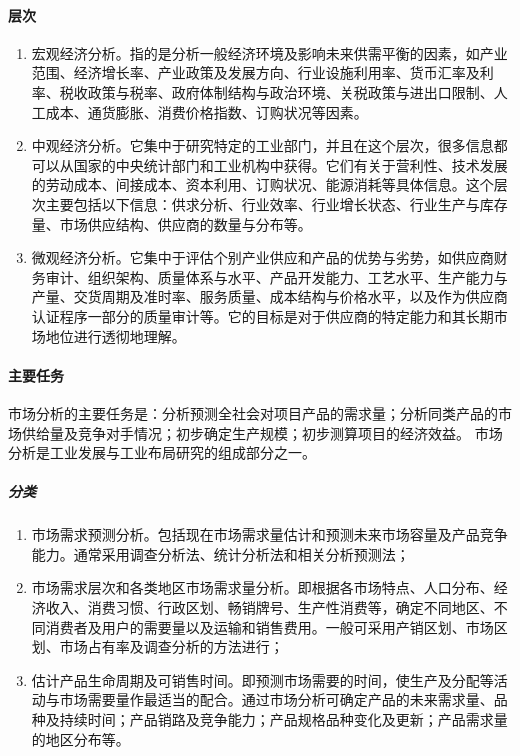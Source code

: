 \documentclass[letterpaper,11pt,english]{sphinxmanual}
\begin{document}
\paragraph{层次}
\label{\detokenize{chapter_knowledge/market_analysis:id2}}\begin{enumerate}
%
\item {} 
宏观经济分析。指的是分析一般经济环境及影响未来供需平衡的因素，如产业范围、经济增长率、产业政策及发展方向、行业设施利用率、货币汇率及利率、税收政策与税率、政府体制结构与政治环境、关税政策与进出口限制、人工成本、通货膨胀、消费价格指数、订购状况等因素。

\item {} 
中观经济分析。它集中于研究特定的工业部门，并且在这个层次，很多信息都可以从国家的中央统计部门和工业机构中获得。它们有关于营利性、技术发展的劳动成本、间接成本、资本利用、订购状况、能源消耗等具体信息。这个层次主要包括以下信息：供求分析、行业效率、行业增长状态、行业生产与库存量、市场供应结构、供应商的数量与分布等。

\item {} 
微观经济分析。它集中于评估个别产业供应和产品的优势与劣势，如供应商财务审计、组织架构、质量体系与水平、产品开发能力、工艺水平、生产能力与产量、交货周期及准时率、服务质量、成本结构与价格水平，以及作为供应商认证程序一部分的质量审计等。它的目标是对于供应商的特定能力和其长期市场地位进行透彻地理解。

\end{enumerate}


\paragraph{主要任务}
\label{\detokenize{chapter_knowledge/market_analysis:id3}}
市场分析的主要任务是：分析预测全社会对项目产品的需求量；分析同类产品的市场供给量及竞争对手情况；初步确定生产规模；初步测算项目的经济效益。
市场分析是工业发展与工业布局研究的组成部分之一。


\subparagraph{分类}
\label{\detokenize{chapter_knowledge/market_analysis:id4}}\begin{enumerate}
%
\item {} 
市场需求预测分析。包括现在市场需求量估计和预测未来市场容量及产品竞争能力。通常采用调查分析法、统计分析法和相关分析预测法；

\item {} 
市场需求层次和各类地区市场需求量分析。即根据各市场特点、人口分布、经济收入、消费习惯、行政区划、畅销牌号、生产性消费等，确定不同地区、不同消费者及用户的需要量以及运输和销售费用。一般可采用产销区划、市场区划、市场占有率及调查分析的方法进行；

\item {} 
估计产品生命周期及可销售时间。即预测市场需要的时间，使生产及分配等活动与市场需要量作最适当的配合。通过市场分析可确定产品的未来需求量、品种及持续时间；产品销路及竞争能力；产品规格品种变化及更新；产品需求量的地区分布等。

\end{enumerate}
\end{document}
